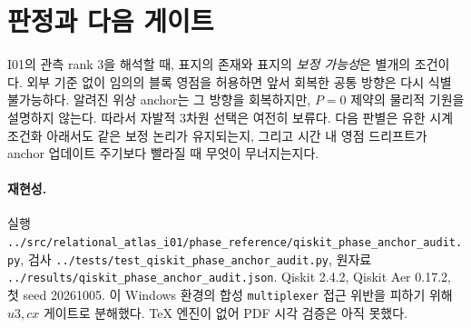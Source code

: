 \documentclass[11pt,a4paper]{article}
\begin{document}
\section{판정과 다음 게이트}
I01의 관측 rank 3을 해석할 때, 표지의 존재와 표지의
\emph{보정 가능성}은 별개의 조건이다. 외부 기준 없이 임의의
블록 영점을 허용하면 앞서 회복한 공통 방향은 다시 식별 불가능하다.
알려진 위상 anchor는 그 방향을 회복하지만, $P=0$ 제약의
물리적 기원을 설명하지 않는다. 따라서 자발적 3차원 선택은
여전히 보류다. 다음 판별은 유한 시계 조건화 아래서도
같은 보정 논리가 유지되는지, 그리고 시간 내 영점 드리프트가
anchor 업데이트 주기보다 빨라질 때 무엇이 무너지는지다.

\paragraph{재현성.}
실행 \texttt{../src/relational\_atlas\_i01/phase\_reference/qiskit\_phase\_anchor\_audit.py},
검사 \texttt{../tests/test\_qiskit\_phase\_anchor\_audit.py},
원자료 \texttt{../results/qiskit\_phase\_anchor\_audit.json}.
Qiskit 2.4.2, Qiskit Aer 0.17.2, 첫 seed 20261005.
이 Windows 환경의 합성 \texttt{multiplexer} 접근 위반을
피하기 위해 $u3,cx$ 게이트로 분해했다. TeX 엔진이 없어
PDF 시각 검증은 아직 못했다.
\end{document}
